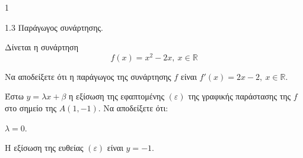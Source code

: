 \begin{ylh}{1}
    \item 1.3 Παράγωγος συνάρτησης.
\end{ylh}
Δίνεται η συνάρτηση
\[ f(x) = x^2 - 2x, \ x \in \mathbb{R} \]
\begin{alist}
\item Να αποδείξετε ότι η παράγωγος της συνάρτησης $f$ είναι $f'(x) = 2x - 2, \ x \in \mathbb{R}$.
\end{alist}
Έστω $y = \lambda x + \beta$ η εξίσωση της εφαπτομένης $(\varepsilon)$ της γραφικής παράστασης της $f$ στο σημείο της $A(1, -1)$. Να αποδείξετε ότι:
\begin{alist}\setcounter{enumi}{1}
\item $\lambda = 0$.
\item Η εξίσωση της ευθείας $(\varepsilon)$ είναι $y = -1$.
\end{alist}

